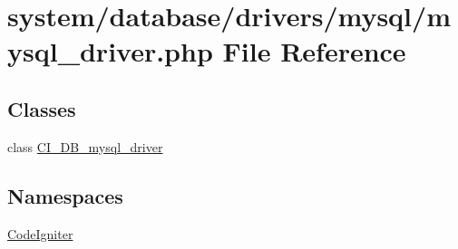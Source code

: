 \hypertarget{mysql__driver_8php}{}\section{system/database/drivers/mysql/mysql\+\_\+driver.php File Reference}
\label{mysql__driver_8php}
\subsection*{Classes}
\begin{DoxyCompactItemize}
\item 
class \mbox{\hyperlink{class_c_i___d_b__mysql__driver}{C\+I\+\_\+\+D\+B\+\_\+mysql\+\_\+driver}}
\end{DoxyCompactItemize}
\subsection*{Namespaces}
\begin{DoxyCompactItemize}
\item 
 \mbox{\hyperlink{namespace_code_igniter}{Code\+Igniter}}
\end{DoxyCompactItemize}
